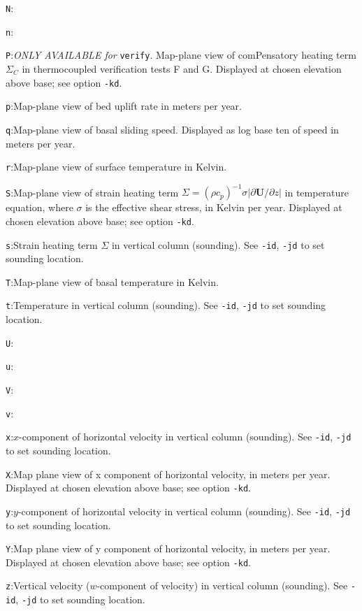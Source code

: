 \documentclass[11pt,final]{amsart}
\renewcommand{\t}[1]{\texttt{#1}}
\newcommand{\bU}{\mathbf{U}}
\begin{document}
\verb|N|:\quad

\verb|n|:\quad

\verb|P|:\quad \emph{ONLY AVAILABLE for }\t{verify}.  Map-plane view of comPensatory heating term $\Sigma_C$ in thermocoupled verification tests F and G.  Displayed at chosen elevation above base; see option \verb|-kd|.

\verb|p|:\quad Map-plane view of bed uplift rate in meters per year.

\verb|q|:\quad Map-plane view of basal sliding speed.  Displayed as log base ten of speed in meters per year.

\verb|r|:\quad Map-plane view of surface temperature in Kelvin.

\verb|S|:\quad Map-plane view of strain heating term $\Sigma=(\rho c_p)^{-1}\sigma |\partial \bU/\partial z|$ in temperature equation, where $\sigma$ is the effective shear stress, in Kelvin per year.  Displayed at chosen elevation above base; see option \verb|-kd|.

\verb|s|:\quad Strain heating term $\Sigma$ in vertical column (sounding).  See \verb|-id|, \verb|-jd| to set sounding location.

\verb|T|:\quad Map-plane view of basal temperature in Kelvin.

\verb|t|:\quad Temperature in vertical column (sounding).  See \verb|-id|, \verb|-jd| to set sounding location.

\verb|U|:\quad

\verb|u|:\quad

\verb|V|:\quad

\verb|v|:\quad

\verb|x|:\quad $x$-component of horizontal velocity in vertical column (sounding).  See \verb|-id|, \verb|-jd| to set sounding location.

\verb|X|:\quad Map plane view of x component of horizontal velocity, in meters per year.  Displayed at chosen elevation above base; see option \verb|-kd|.

\verb|y|:\quad $y$-component of horizontal velocity in vertical column (sounding).  See \verb|-id|, \verb|-jd| to set sounding location.

\verb|Y|:\quad Map plane view of y component of horizontal velocity, in meters per year.  Displayed at chosen elevation above base; see option \verb|-kd|.

\verb|z|:\quad Vertical velocity ($w$-component of velocity) in vertical column (sounding).  See \verb|-id|, \verb|-jd| to set sounding location.
\end{document}
